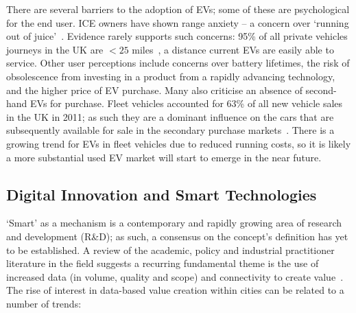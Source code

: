 \documentclass[b5paper,10pt]{article}
\begin{document}
There are several barriers to the adoption of EVs; some of these are
psychological for the end user. ICE owners have shown range anxiety --
a concern over `running out of
juice'~\citep{oflev:2011,yilmaz+krein:2012}. Evidence rarely supports
such concerns: 95\% of all private vehicles journeys in the UK are
$<25$ miles~\citep{oflev:2011}, a distance current EVs are easily able
to service. Other user perceptions include concerns over battery
lifetimes, the risk of obsolescence from investing in a product from a
rapidly advancing technology, and the higher price of EV purchase.
Many also criticise an absence of second-hand EVs for purchase. Fleet
vehicles accounted for 63\% of all new vehicle sales in the UK in
2011; as such they are a dominant influence on the cars that are
subsequently available for sale in the secondary purchase
markets~\citep{fleets:2012}. There is a growing trend for EVs in fleet
vehicles due to reduced running costs, so it is likely a more
substantial used EV market will start to emerge in the near future.


\subsection{Digital Innovation and Smart Technologies}

`Smart' as a mechanism is a contemporary and rapidly growing area of
research and development (R\&D); as such, a consensus on the concept's
definition has yet to be established. A review of the academic, policy
and industrial practitioner literature in the field suggests a
recurring fundamental theme is the use of increased data (in volume,
quality and scope) and connectivity to create
value~\citep{komninos:2002,arup-et-al:2011,harrison+abbottdonnelly:2011,batty-et-al:2012,buscher:2014}. The
rise of interest in data-based value creation within cities can be
related to a number of trends:
\end{document}
